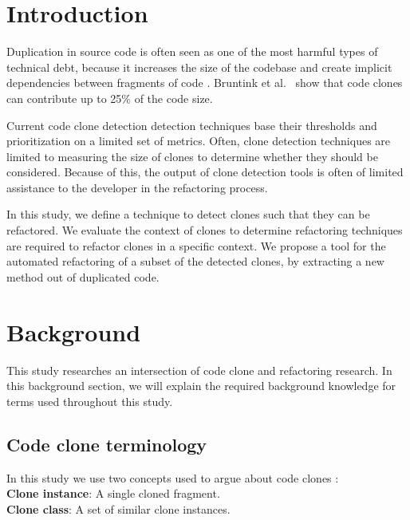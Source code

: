 \documentclass[sigconf,review, table]{acmart}
\begin{document}
\maketitle

\section{Introduction}
Duplication in source code is often seen as one of the most harmful types of technical debt, because it increases the size of the codebase and create implicit dependencies between fragments of code \cite{ostberg2014automatically}. Bruntink et al.~\cite{bruntink2005use} show that code clones can contribute up to 25\% of the code size.

Current code clone detection detection techniques base their thresholds and prioritization on a limited set of metrics. Often, clone detection techniques are limited to measuring the size of clones to determine whether they should be considered. Because of this, the output of clone detection tools is often of limited assistance to the developer in the refactoring process.

In this study, we define a technique to detect clones such that they can be refactored. We evaluate the context of clones to determine refactoring techniques are required to refactor clones in a specific context. We propose a tool for the automated refactoring of a subset of the detected clones, by extracting a new method out of duplicated code.

\section{Background}
This study researches an intersection of code clone and refactoring research. In this background section, we will explain the required background knowledge for terms used throughout this study.

\subsection{Code clone terminology}
In this study we use two concepts used to argue about code clones \cite{roy2007survey}:
\\ \textbf{Clone instance}: A single cloned fragment.
\\ \textbf{Clone class}: A set of similar clone instances.

\end{document}
